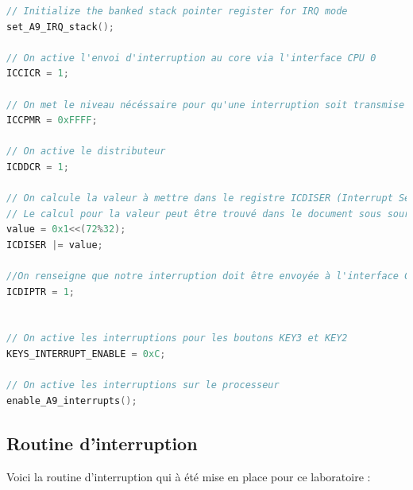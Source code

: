 \begin{lstlisting}[language=C]
// Initialize the banked stack pointer register for IRQ mode
set_A9_IRQ_stack();

// On active l'envoi d'interruption au core via l'interface CPU 0
ICCICR = 1;

// On met le niveau nécéssaire pour qu'une interruption soit transmise au cpu au minimum afin que toutes les interruptions passent.
ICCPMR = 0xFFFF;

// On active le distributeur
ICDDCR = 1;

// On calcule la valeur à mettre dans le registre ICDISER (Interrupt Set Enable Registers) et on remplit le registre
// Le calcul pour la valeur peut être trouvé dans le document sous source dans l'entête.
value = 0x1<<(72%32); 
ICDISER |= value;

//On renseigne que notre interruption doit être envoyée à l'interface CPU 0
ICDIPTR = 1;


// On active les interruptions pour les boutons KEY3 et KEY2
KEYS_INTERRUPT_ENABLE = 0xC;

// On active les interruptions sur le processeur
enable_A9_interrupts();
\end{lstlisting}


\subsection{Routine d'interruption}

Voici la routine d'interruption qui à été mise en place pour ce laboratoire :\\
 
